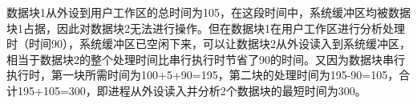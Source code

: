 \par{}
\begin{solution}数据块1从外设到用户工作区的总时间为105，在这段时间中，系统缓冲区均被数据块1占据，因此对数据块2无法进行操作。但在数据块1在用户工作区进行分析处理时（时间90），系统缓冲区已空闲下来，可以让数据块2从外设读入到系统缓冲区，相当于数据块2的整个处理时间比串行执行时节省了90的时间。又因为数据块串行执行时，第一块所需时间为100+5+90=195，第二块的处理时间为195-90=105，合计195+105=300，即进程从外设读入并分析2个数据块的最短时间为300。
\end{solution}
